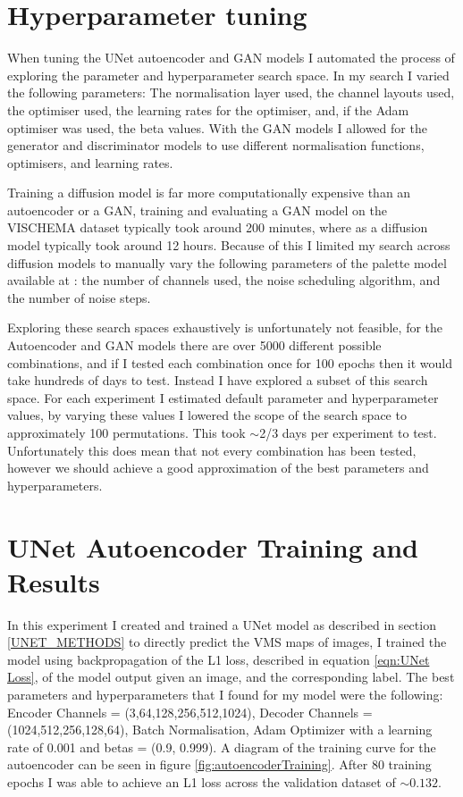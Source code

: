 \documentclass{UoYCSproject}
\begin{document}
\section{Hyperparameter tuning}

When tuning the UNet autoencoder and GAN models I automated the process of exploring the parameter and hyperparameter search space. In my search I varied the following parameters: The normalisation layer used, the channel layouts used, the optimiser used, the learning rates for the optimiser, and, if the Adam optimiser was used, the beta values. With the GAN models I allowed for the generator and discriminator models to use different normalisation functions, optimisers, and learning rates. 

Training a diffusion model is far more computationally expensive than an autoencoder or a GAN, training and evaluating a GAN model on the VISCHEMA dataset typically took around 200 minutes, where as a diffusion model typically took around 12 hours. 
Because of this I limited my search across diffusion models to manually vary the following parameters of the palette model available at \cite{JanspiryPalette}: the number of channels used, the noise scheduling algorithm, and the number of noise steps.

Exploring these search spaces exhaustively is unfortunately not feasible, for the Autoencoder and GAN models there are over 5000 different possible combinations, and if I tested each combination once for 100 epochs then it would take hundreds of days to test.
Instead I have explored a subset of this search space. For each experiment I estimated default parameter and hyperparameter values, by varying these values I lowered the scope of the search space to approximately 100 permutations. This took \(\sim\)2/3 days per experiment to test. Unfortunately this does mean that not every combination has been tested, however we should achieve a good approximation of the best parameters and hyperparameters.

\section{UNet Autoencoder Training and Results}

In this experiment I created and trained a UNet model as described in section \ref{UNET_METHODS} to directly predict the VMS maps of images, I trained the model using backpropagation of the L1 loss, described in equation \ref{eqn:UNet Loss}, of the model output given an image, and the corresponding label. The best parameters and hyperparameters that I found for my model were the following: Encoder Channels = (3,64,128,256,512,1024), Decoder Channels = (1024,512,256,128,64), Batch Normalisation, Adam Optimizer with a learning rate of 0.001 and betas = (0.9, 0.999). A diagram of the training curve for the autoencoder can be seen in figure \ref{fig:autoencoderTraining}. After 80 training epochs I was able to achieve an L1 loss across the validation dataset of \( \sim 0.132 \). 
\end{document}
